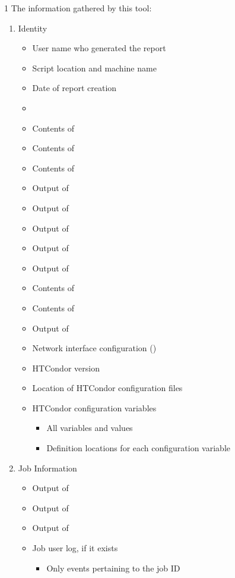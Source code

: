 \begin{ManPage}{\label{man-condor-gather-info}}{1}
The information gathered by this tool:
\begin{enumerate}
	\item Identity
	\begin{itemize}
          \item User name who generated the report
          \item Script location and machine name
          \item Date of report creation
          \item {}
          \item Contents of 
          \item Contents of 
          \item Contents of 
          \item Output of 
          \item Output of 
          \item Output of 
          \item Output of 
          \item Output of 
          \item Contents of 
          \item Contents of 
          \item Output of 
          \item Network interface configuration ()
          \item HTCondor version
          \item Location of HTCondor configuration files
          \item HTCondor configuration variables
		  \begin{itemize}
                \item All variables and values
                \item Definition locations for each configuration variable 
		  \end{itemize}
	\end{itemize}
	\item Job Information
	\begin{itemize}
    	\item Output of 
    	\item Output of 
    	\item Output of 
    	\item Job user log, if it exists
		\begin{itemize}
          	\item Only events pertaining to the job ID 
		\end{itemize}
	\end{itemize}
\end{enumerate}


\end{ManPage}
